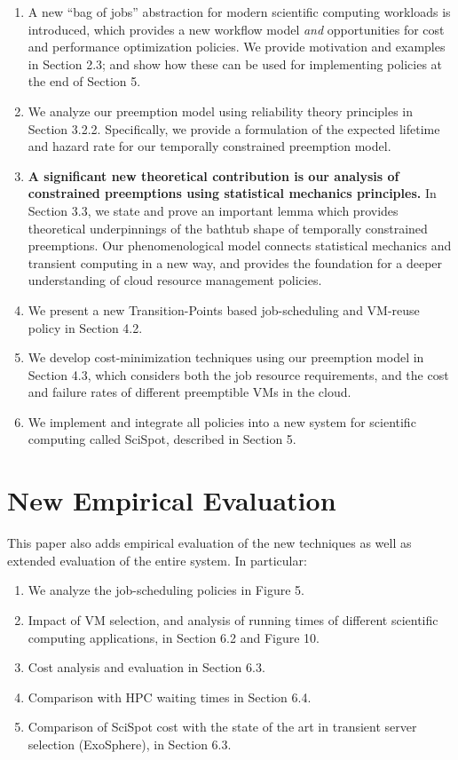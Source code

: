 \documentclass{article}
\begin{document}
\begin{enumerate}

\item A new ``bag of jobs'' abstraction for modern scientific computing workloads is introduced, which provides a new workflow model \emph{and} opportunities for cost and performance optimization policies. We provide motivation and examples in Section 2.3; and show how these can be used for implementing policies at the end of Section 5. 
  
\item We analyze our preemption model using reliability theory principles in Section 3.2.2. Specifically, we provide a formulation of the expected lifetime and hazard rate for our temporally constrained preemption model.
 
\item \textbf{A significant new theoretical contribution is our analysis of constrained preemptions using statistical mechanics principles.} In Section 3.3, we state and prove an important lemma which provides theoretical underpinnings of the bathtub shape of temporally constrained preemptions. Our phenomenological model connects statistical mechanics and transient computing in a new way, and provides the foundation for a deeper understanding of cloud resource management policies. 

\item We present a new Transition-Points based job-scheduling and VM-reuse policy in Section 4.2. 

\item We develop cost-minimization techniques using our preemption model in Section 4.3, which considers both the job resource requirements, and the cost and failure rates of different preemptible VMs in the cloud. 

\item We implement and integrate all policies into a new system for scientific computing called SciSpot, described in Section 5. 

\end{enumerate}

\section{New Empirical Evaluation}

This paper also adds empirical evaluation of the new techniques as well as extended evaluation of the entire system. In particular:

\begin{enumerate}
\item We analyze the job-scheduling policies in Figure 5. 
\item Impact of VM selection, and analysis of running times of different scientific computing applications, in Section 6.2 and Figure 10.
\item Cost analysis and evaluation in Section 6.3. 
\item Comparison with HPC waiting times in Section 6.4. 
\item Comparison of SciSpot cost with the state of the art in transient server selection (ExoSphere), in Section 6.3. 
\end{enumerate}
\end{document}
